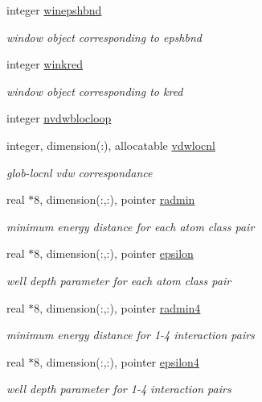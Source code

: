 \begin{DoxyCompactItemize}
integer \hyperlink{classvdw_af2f988f5bda479a9434fd55813e86f1f}{winepshbnd}
\begin{DoxyCompactList}\small\item\em window object corresponding to epshbnd \end{DoxyCompactList}\item 
integer \hyperlink{classvdw_a41d847388846c64c9b93a49d3af33ce5}{winkred}
\begin{DoxyCompactList}\small\item\em window object corresponding to kred \end{DoxyCompactList}\item 
integer \hyperlink{classvdw_a743bd22f09805770b61b2fccc4a7f0ac}{nvdwblocloop}
\item 
integer, dimension(\-:), allocatable \hyperlink{classvdw_a00f7569676b7321ddce0cbd95bd9194a}{vdwlocnl}
\begin{DoxyCompactList}\small\item\em glob-\/locnl vdw correspondance \end{DoxyCompactList}\item 
real $\ast$8, dimension(\-:,\-:), pointer \hyperlink{classvdw_a481ad3e2f4a49e4955944495e0e7618e}{radmin}
\begin{DoxyCompactList}\small\item\em minimum energy distance for each atom class pair \end{DoxyCompactList}\item 
real $\ast$8, dimension(\-:,\-:), pointer \hyperlink{classvdw_a429fafea5721eb9044615b9d14c6c652}{epsilon}
\begin{DoxyCompactList}\small\item\em well depth parameter for each atom class pair \end{DoxyCompactList}\item 
real $\ast$8, dimension(\-:,\-:), pointer \hyperlink{classvdw_a6b56f2ac675c5d7c8c776c2d6588a902}{radmin4}
\begin{DoxyCompactList}\small\item\em minimum energy distance for 1-\/4 interaction pairs \end{DoxyCompactList}\item 
real $\ast$8, dimension(\-:,\-:), pointer \hyperlink{classvdw_a10411acf35a5a3fdec626d2784b45f51}{epsilon4}
\begin{DoxyCompactList}\small\item\em well depth parameter for 1-\/4 interaction pairs \end{DoxyCompactList}\item 

\end{DoxyCompactItemize}
